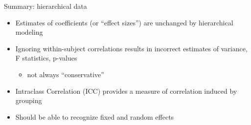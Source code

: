 \documentclass[
  ignorenonframetext,
]{beamer}
\providecommand{\tightlist}{%
  \setlength{\itemsep}{0pt}\setlength{\parskip}{0pt}}
\begin{document}
\begin{frame}{Summary: hierarchical data}
\protect\hypertarget{summary-hierarchical-data}{}

\begin{itemize}
\tightlist
\item
  Estimates of coefficients (or ``effect sizes'') are unchanged by
  hierarchical modeling
\item
  Ignoring within-subject correlations results in incorrect estimates of
  variance, F statistics, p-values

  \begin{itemize}
  \tightlist
  \item
    not always ``conservative''
  \end{itemize}
\item
  Intraclass Correlation (ICC) provides a measure of correlation induced
  by grouping
\item
  Should be able to recognize fixed and random effects
\end{itemize}

\end{frame}
\end{document}
